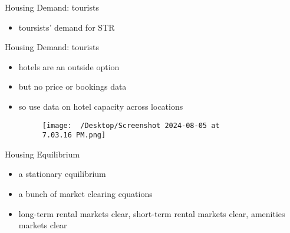 \begin{frame}{Housing Demand: tourists}
    \begin{itemize}
         \item toursists' demand for STR
            \begin{figure}
                \centering
                \caption{}
                \label{fig:photo}
            \end{figure}
    \end{itemize}
 \end{frame}

\begin{frame}{Housing Demand: tourists}
    \begin{itemize}
         \item hotels are an outside option
         \item but no price or bookings data
         \item so use data on hotel capacity across locations 
            \begin{figure}
                \centering
                \texttt{[image: ~/Desktop/Screenshot 2024-08-05 at 7.03.16 PM.png]}
                \caption{}
                \label{fig:photo}
            \end{figure}
    \end{itemize}
 \end{frame}


\begin{frame}{Housing Equilibrium}
    \begin{itemize}
         \item a stationary equilibrium
         \item a bunch of market clearing equations
         \item long-term rental markets clear, short-term rental markets clear, amenities markets clear
    \end{itemize}
 \end{frame}


